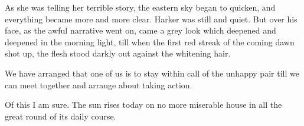 As she was telling her terrible story, the eastern sky began to quicken, and everything became more and more clear. Harker was still and quiet. But over his face, as the awful narrative went on, came a grey look which deepened and deepened in the morning light, till when the first red streak of the coming dawn shot up, the flesh stood darkly out against the whitening hair. 

We have arranged that one of us is to stay within call of the unhappy pair till we can meet together and arrange about taking action. 

Of this I am sure. The sun rises today on no more miserable house in all the great round of its daily course. 
